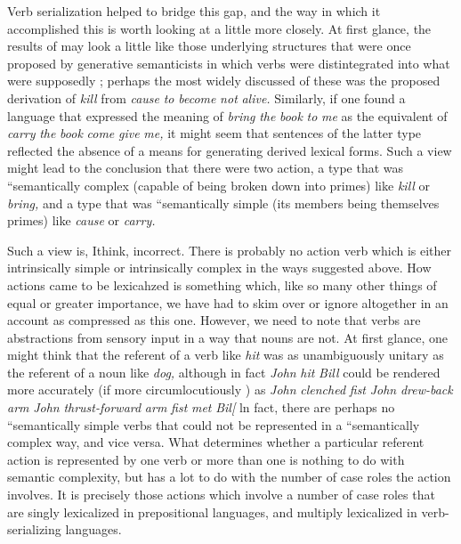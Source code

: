 Verb serialization helped to bridge this gap, and the way in which it accomplished this is worth looking at a little more closely. At first glance, the results of  may look a little like those underlying structures that were once proposed by generative semanti\-cists in which verbs were distintegrated into what were supposedly ; perhaps the most widely discussed of these was the
proposed derivation of \textit{kill} from \textit{cause} \textit{to} \textit{become} \textit{not} \textit{alive.} Similarly,
if one found a language that expressed the meaning of \textit{bring} \textit{the} \textit{book} \textit{to} \textit{me} as the equivalent of \textit{carry} \textit{the} \textit{book} \textit{come} \textit{give} \textit{me,} it might seem that sentences of the latter type reflected the absence of a means for generating derived lexical forms. Such a view might lead to the conclu\-sion that there were two  action, a type that was ``semantically complex (capable of being broken down into primes) like \textit{kill }or \textit{bring,} and a type that was ``semantically simple (its members being themselves primes) like \textit{cause} or \textit{carry.}

Such a view is, Ithink, incorrect. There is probably no action verb which is either intrinsically simple or intrinsically complex in the ways suggested above. How actions came to be lexicahzed is something which, like so many other things of equal or greater importance, we
have had to skim over or ignore altogether in an account as compressed as this one. However, we need to note that verbs are abstractions from sensory input in a way that nouns are not. At first glance, one might think that the referent of a verb like \textit{hit} was as unambiguously unitary as the referent of a noun like \textit{dog,} although in fact \textit{John} \textit{hit} \textit{Bill} could be rendered more accurately (if more circumlocutiously ) as \textit{John} \textit{clenched} \textit{fist} \textit{John} \textit{drew-back} \textit{a}\textit{r}\textit{m} \textit{John} \textit{thrust}\textit{{}-}\textit{forward} \textit{arm} \textit{fist} \textit{met} \textit{Bil[} ln fact, there are perhaps no ``semantically simple verbs that could not be represented in a ``semantically complex way, and vice versa. What determines whether a particular referent action is repre\-sented by one verb or more than one is nothing to do with semantic complexity, but has a lot to do with the number of case roles the action involves. It is precisely those actions which involve a number of case roles that are singly lexicalized in prepositional languages, and multiply lexicalized in verb-serializing languages.


